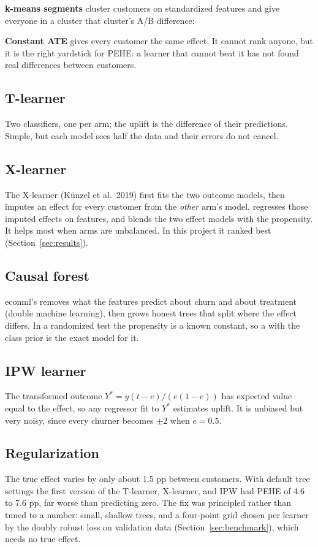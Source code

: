 \documentclass[11pt]{article}
\begin{document}
\textbf{k-means segments} cluster customers on standardized features and give everyone in a cluster that cluster's A/B difference:

\textbf{Constant ATE} gives every customer the same effect. It cannot rank anyone, but it is the right yardstick for PEHE: a learner that cannot beat it has not found real differences between customers.

\subsection{T-learner}
Two classifiers, one per arm; the uplift is the difference of their predictions. Simple, but each model sees half the data and their errors do not cancel.

\subsection{X-learner}
The X-learner (K\"unzel et al.\ 2019) first fits the two outcome models, then imputes an effect for every customer from the \emph{other} arm's model, regresses those imputed effects on features, and blends the two effect models with the propensity. It helps most when arms are unbalanced. In this project it ranked best (Section~\ref{sec:results}).

\subsection{Causal forest}
econml's  removes what the features predict about churn and about treatment (double machine learning), then grows honest trees that split where the effect differs. In a randomized test the propensity is a known constant, so a  with the class prior is the exact model for it.

\subsection{IPW learner}
The transformed outcome $Y^* = y(t - e)/(e(1-e))$ has expected value equal to the effect, so any regressor fit to $Y^*$ estimates uplift. It is unbiased but very noisy, since every churner becomes $\pm 2$ when $e = 0.5$.

\subsection{Regularization}
The true effect varies by only about 1.5 pp between customers. With default tree settings the first version of the T-learner, X-learner, and IPW had PEHE of 4.6 to 7.6 pp, far worse than predicting zero. The fix was principled rather than tuned to a number: small, shallow trees, and a four-point grid chosen per learner by the doubly robust loss on validation data (Section~\ref{sec:benchmark}), which needs no true effect.
\end{document}
